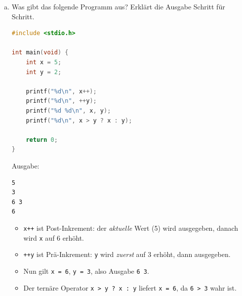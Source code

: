 \begin{enumerate}[a)]
\item Was gibt das folgende Programm aus? Erklärt die Ausgabe Schritt für Schritt.

\begin{lstlisting}[language=C]
#include <stdio.h>

int main(void) {
    int x = 5;
    int y = 2;

    printf("%d\n", x++);
    printf("%d\n", ++y);
    printf("%d %d\n", x, y);
    printf("%d\n", x > y ? x : y);

    return 0;
}
\end{lstlisting}

\begin{loesung}
Ausgabe:
\begin{lstlisting}[language={}]
5
3
6 3
6
\end{lstlisting}

\begin{itemize}
  \item \texttt{x++} ist Post-Inkrement: der \emph{aktuelle} Wert (5) wird ausgegeben, danach wird \texttt{x} auf 6 erhöht.
  \item \texttt{++y} ist Prä-Inkrement: \texttt{y} wird \emph{zuerst} auf 3 erhöht, dann ausgegeben.
  \item Nun gilt \texttt{x = 6}, \texttt{y = 3}, also Ausgabe \texttt{6 3}.
  \item Der ternäre Operator \texttt{x > y ? x : y} liefert \texttt{x = 6}, da \texttt{6 > 3} wahr ist.
\end{itemize}
\end{loesung}

\end{enumerate}


